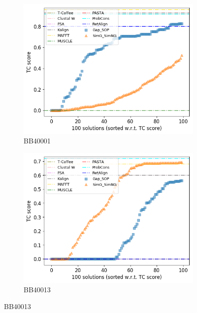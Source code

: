 \begin{figure}[!htbp]
	\centering
	\begin{adjustwidth}{-1cm}{-1cm}
		\begin{subfigure}{0.22\textwidth}
			\includegraphics[width=\columnwidth]{Figure/summary/precomputedInit/Balibase/BB40001_tc_density_single_run_2}
			\caption{BB40001}
		\end{subfigure}	
		\begin{subfigure}{0.22\textwidth}
			\includegraphics[width=\columnwidth]{Figure/summary/precomputedInit/Balibase/BB40013_tc_density_single_run_2}
			\caption{BB40013}
		\end{subfigure}

\end{adjustwidth}
\end{figure}
